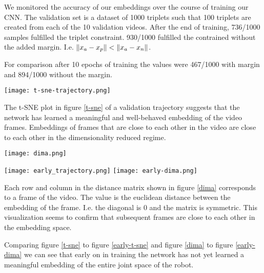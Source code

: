 
We monitored the accuracy of our embeddings over the course of training our CNN. The validation set is a dataset of 1000 triplets such that 100 triplets are created from each of the 10 validation videos. After the end of training, 736/1000 samples fulfilled the triplet constraint. 930/1000 fulfilled the contrained without the added margin. I.e. $\left\lVert x_a - x_p\right\rVert < \left\lVert x_a - x_n\right\rVert$.

For comparison after 10 epochs of training the values were 467/1000 with margin and 894/1000 without the margin.

{
    \centering
    \texttt{[image: t-sne-trajectory.png]}
    \label{t-sne}
    \vspace{0.25cm}
}

The t-SNE plot in figure \ref{t-sne} of a validation trajectory suggests that the network has learned a meaningful and well-behaved embedding of the video frames. Embeddings of frames that are close to each other in the video are close to each other in the dimensionality reduced regime.

{
    \centering
    \texttt{[image: dima.png]}
    \label{dima}
    \vspace{0.25cm}
}

{
    \centering
    \texttt{[image: early\_trajectory.png]}
    \label{early-t-sne}
    \vspace{0.25cm}
}
{
    \centering
    \texttt{[image: early-dima.png]}
    \label{early-dima}
    \vspace{0.25cm}
}

Each row and column in the distance matrix shown in figure \ref{dima} corresponds to a frame of the video. The value is the euclidean distance between the embedding of the frame. I.e. the diagonal is 0 and the matrix is symmetric. This visualization seems to confirm that subsequent frames are close to each other in the embedding space.

Comparing figure \ref{t-sne} to figure \ref{early-t-sne} and figure \ref{dima} to figure \ref{early-dima} we can see that early on in training the network has not yet learned a meaningful embedding of the entire joint space of the robot.

